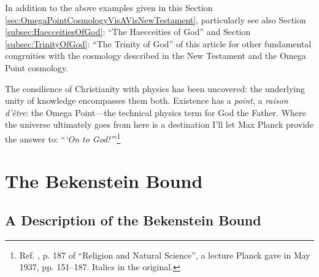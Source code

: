 \documentclass[letterpaper,12pt]{article}
\begin{document}
In addition to the above examples given in this Section \ref{sec:OmegaPointCosmologyVisAVisNewTestament}, particularly see also Section \ref{subsec:HaecceitiesOfGod}: ``The Haecceities of God'' and Section \ref{subsec:TrinityOfGod}: ``The Trinity of God'' of this article for other fundamental congruities with the cosmology described in the New Testament and the Omega Point cosmology.

The consilience of Christianity with physics has been uncovered: the underlying unity of knowledge encompasses them both. Existence has a \emph{point}, a \emph{raison d'\^{e}tre}: the Omega Point---the technical physics term for God the Father. Where the universe ultimately goes from here is a destination I'll let Max Planck provide the answer to: ``\thinspace\emph{`On to God!'}\thinspace ''\footnote{Ref. , p. 187 of ``Religion and Natural Science'', a lecture Planck gave in May 1937, pp. 151--187. Italics in the original.}

\appendix
\appendixpage
\addappheadtotoc

\section{The Bekenstein Bound}
\label{sec:BekensteinBound}

\subsection{A Description of the Bekenstein Bound}
\label{subsec:DescriptionOfBekensteinBound}
\end{document}
